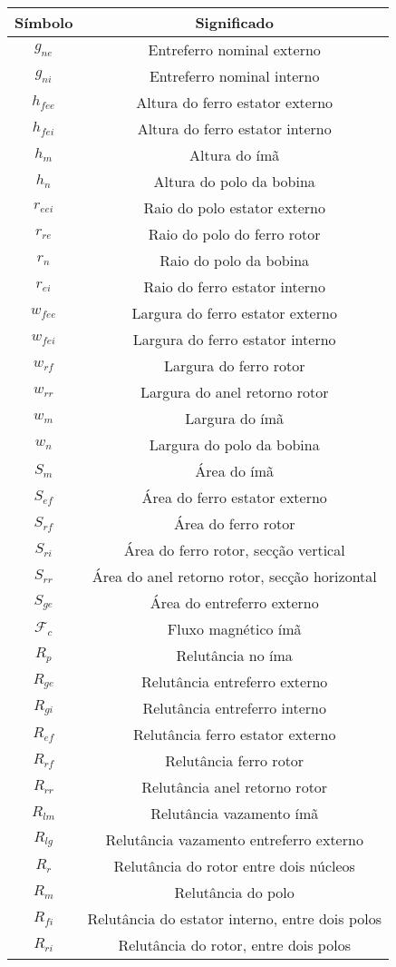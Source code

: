 \begin{tabular}{|c|c|}
Símbolo &  Significado \\ 
\hline \hline

	$g_{ne}$	& Entreferro nominal externo \\
	$g_{ni}$	& Entreferro nominal interno \\

	$h_{fee}$	& Altura do ferro estator externo \\
	$h_{fei}$	& Altura do ferro estator interno \\
	$h_m$		& Altura do ímã \\
	$h_n$		& Altura do polo da bobina \\
	
	$r_{eei}$	& Raio do polo estator externo \\				
	$r_{re}$	& Raio do polo do ferro rotor \\		
	$r_{n}$		& Raio do polo da bobina \\		
	$r_{ei}$	& Raio do ferro estator interno \\	

	$w_{fee}$	& Largura do ferro estator externo\\
	$w_{fei}$	& Largura do ferro estator interno \\
	$w_{rf}$	& Largura do ferro rotor \\
	$w_{rr}$	& Largura do anel retorno rotor \\
	$w_m$		& Largura do ímã \\
	$w_n$		& Largura do polo da bobina \\

	$S_m$		& Área do ímã\\	
	$S_{ef}$	& Área do ferro estator externo \\
	$S_{rf}$	& Área do ferro rotor\\
	$S_{ri}$	& Área do ferro rotor, secção vertical \\
	$S_{rr}$	& Área do anel retorno rotor, secção horizontal\\
	$S_{ge}$	& Área do entreferro externo\\

	$\mathcal{F}_c$ & Fluxo magnético ímã 				\\
	$R_{p}$			& Relutância no íma 				\\
	$R_{ge}$		& Relutância entreferro externo 	\\
	$R_{gi}$		& Relutância entreferro interno \\
	$R_{ef}$		& Relutância ferro estator externo 	\\
	$R_{rf}$		& Relutância ferro rotor 			\\
	$R_{rr}$		& Relutância anel retorno rotor 	\\
	$R_{lm}$		& Relutância vazamento ímã 			\\
	$R_{lg}$		& Relutância vazamento entreferro externo \\
	$R_{r}$			& Relutância do rotor entre dois núcleos \\
	$R_m$			& Relutância do polo \\
	$R_{fi}$		& Relutância do estator interno, entre dois polos\\
	$R_{ri}$		& Relutância do rotor, entre dois polos \\


\end{tabular}
